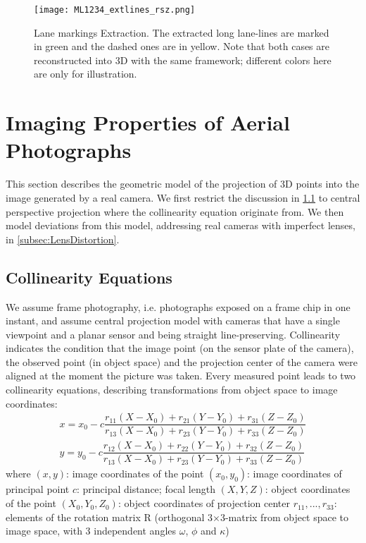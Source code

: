 \begin{figure}
  \centering
  \texttt{[image: ML1234\_extlines\_rsz.png]}
  \caption{\small Lane markings Extraction. The extracted long lane-lines are marked in green and the dashed ones are in yellow.  Note that both cases are reconstructed into 3D with the same framework; different colors here are only for illustration.}
  \label{fig:LineExtraction}
\end{figure}


\clearpage
\section{Imaging Properties of Aerial Photographs}
\label{sec:Geometry}

This section describes the geometric model of the projection of 3D points into the image generated by a real camera. We first restrict the discussion in \cref{subsec:Collinearity} to central perspective projection where the collinearity equation originate from. We then model deviations from this model, addressing real cameras with imperfect lenses, in \cref{subsec:LensDistortion}.

\subsection{Collinearity Equations}
\label{subsec:Collinearity}
We assume frame photography, i.e. photographs exposed on a frame chip in one instant, and assume central projection model with cameras that have a single viewpoint and a planar sensor and being straight line-preserving. Collinearity indicates the condition that the image point (on the sensor plate of the camera), the observed point (in object space) and the projection center of the camera were aligned at the moment the picture was taken. Every measured point leads to two collinearity equations, describing transformations from object space to image coordinates:
\begin{equation} \label{eq:collinearity}
\begin{split}
x = x_0 -c \dfrac {r_{11}(X-X_0) + r_{21}(Y-Y_0) + r_{31}(Z-Z_0)} {r_{13}(X-X_0) + r_{23}(Y-Y_0) + r_{33}(Z-Z_0)} \\
y = y_0 -c \dfrac {r_{12}(X-X_0) + r_{22}(Y-Y_0) + r_{32}(Z-Z_0)} {r_{13}(X-X_0) + r_{23}(Y-Y_0) + r_{33}(Z-Z_0)}
\end{split}
\end{equation}
where\newline
$(x, y)$: image coordinates of the point \newline
$(x_0, y_0)$: image coordinates of principal point \newline
$c$: principal distance; focal length \newline
$(X, Y, Z)$: object coordinates of the point \newline
$(X_0, Y_0, Z_0)$: object coordinates of projection center \newline
$r_{11},...,r_{33}$: elements of the rotation matrix R (orthogonal 3$\times$3-matrix from object space to image space, with 3 independent angles $\omega$, $\phi$ and $\kappa$)

